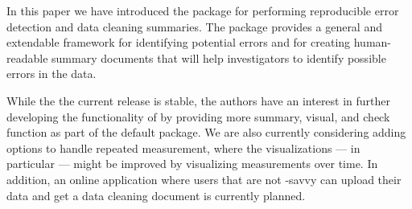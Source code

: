 \documentclass[article,shortnames]{jss}
\newcommand{\hl}[1]{\textcolor{magenta}{#1}}
\begin{document}
In this paper we have introduced the  package 
for performing reproducible error detection and data cleaning
summaries. The package provides a general and extendable framework for
identifying potential errors and for creating human-readable summary
documents that will help investigators to identify possible errors in
the data.


While the the current release is stable, the authors have an interest
in further developing the functionality of  by providing
more summary, visual, and check function as part of the default
package. We are also currently considering adding options to handle
repeated measurement, where the visualizations --- in particular ---
might be improved by visualizing measurements over time. In addition,
an online  \citep{shiny} application where users that are not
-savvy can upload their data and get a data cleaning
document is currently planned.




% 



\appendix
\newpage

% 








\end{document}
